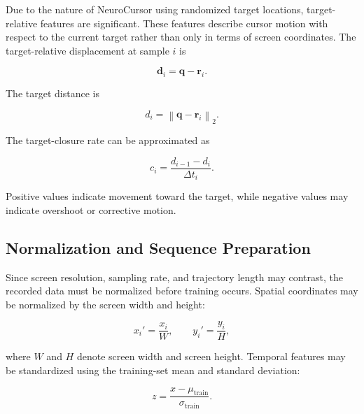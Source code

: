 \documentclass[conference]{IEEEtran}
\begin{document}
Due to the nature of NeuroCursor using randomized target locations, target-relative features are significant. These features describe cursor motion with respect to the current target rather than only in terms of screen coordinates. The target-relative displacement at sample $i$ is 

\begin{equation}
\mathbf{d}_i
=
\mathbf{q}-\mathbf{r}_i.
\label{eq:target_relative_displacement}
\end{equation}

The target distance is

\begin{equation}
d_i
=
\left\|
\mathbf{q}-\mathbf{r}_i
\right\|_2.
\label{eq:target_distance}
\end{equation}

The target-closure rate can be approximated as

\begin{equation}
c_i
=
\frac{d_{i-1}-d_i}{\Delta t_i}.
\label{eq:closure_rate}
\end{equation}

Positive values indicate movement toward the target, while negative values
may indicate overshoot or corrective motion.

\subsection{Normalization and Sequence Preparation}

Since screen resolution, sampling rate, and trajectory length may contrast, the recorded data must be normalized before training occurs. Spatial coordinates may be normalized by the screen width and height:

\begin{equation}
x_i'=\frac{x_i}{W},
\qquad
y_i'=\frac{y_i}{H},
\label{eq:spatial_normalization}
\end{equation}

where $W$ and $H$ denote screen width and screen height. Temporal features
may be standardized using the training-set mean and standard deviation:

\begin{equation}
z
=
\frac{x-\mu_{\mathrm{train}}}{\sigma_{\mathrm{train}}}.
\label{eq:zscore_normalization}
\end{equation}

\end{document}
